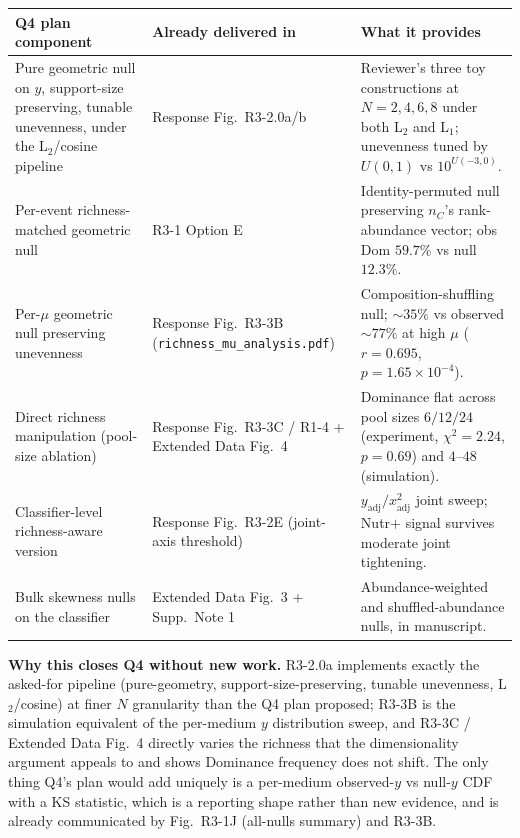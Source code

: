 \documentclass[11pt]{article}
\begin{document}
\begin{center}
\small
\begin{tabular}{p{} p{} p{}}
\toprule
\textbf{Q4 plan component} & \textbf{Already delivered in} & \textbf{What it provides} \\
\midrule
Pure geometric null on $y$, support-size preserving, tunable unevenness, under the L$_2$/cosine pipeline &
Response Fig.~R3-2.0a/b &
Reviewer's three toy constructions at $N = 2, 4, 6, 8$ under both L$_2$ and L$_1$; unevenness tuned by $U(0,1)$ vs $10^{U(-3,0)}$. \\
Per-event richness-matched geometric null &
R3-1 Option E &
Identity-permuted null preserving $n_C$'s rank-abundance vector; obs Dom $59.7\%$ vs null $12.3\%$. \\
Per-$\mu$ geometric null preserving unevenness &
Response Fig.~R3-3B \newline (\texttt{richness\_mu\_analysis.pdf}) &
Composition-shuffling null; $\sim 35\%$ vs observed $\sim 77\%$ at high $\mu$ ($r = 0.695$, $p = 1.65 \times 10^{-4}$). \\
Direct richness manipulation (pool-size ablation) &
Response Fig.~R3-3C / R1-4 \newline + Extended Data Fig.~4 &
Dominance flat across pool sizes $6/12/24$ (experiment, $\chi^2 = 2.24$, $p = 0.69$) and $4$--$48$ (simulation). \\
Classifier-level richness-aware version &
Response Fig.~R3-2E (joint-axis threshold) &
$y_{\mathrm{adj}} / x^2_{\mathrm{adj}}$ joint sweep; Nutr$+$ signal survives moderate joint tightening. \\
Bulk skewness nulls on the classifier &
Extended Data Fig.~3 + Supp.~Note 1 &
Abundance-weighted and shuffled-abundance nulls, in manuscript. \\
\bottomrule
\end{tabular}
\end{center}

\noindent\textbf{Why this closes Q4 without new work.}
R3-2.0a implements exactly the asked-for pipeline (pure-geometry, support-size-preserving, tunable unevenness, L$_2$/cosine) at finer $N$ granularity than the Q4 plan proposed; R3-3B is the simulation equivalent of the per-medium $y$ distribution sweep, and R3-3C / Extended Data Fig.~4 directly varies the richness that the dimensionality argument appeals to and shows Dominance frequency does not shift. The only thing Q4's plan would add uniquely is a per-medium observed-$y$ vs null-$y$ CDF with a KS statistic, which is a reporting shape rather than new evidence, and is already communicated by Fig.~R3-1J (all-nulls summary) and R3-3B.
\end{document}
